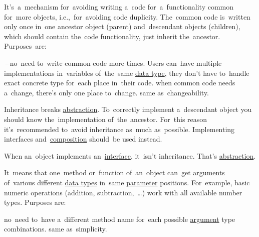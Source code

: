 \label{inheritance}
It's~a~mechanism for~avoiding writing a~code for~a~functionality common for~more objects, i.e.,~for~avoiding code duplicity.
The~common code is~written only once in~one ancestor object (parent) and~descendant objects (children), which should contain the~code functionality, just inherit the~ancestor.
Purposes~are:
\begin{itemize}
    \,--\,no~need to~write common code more times.
            Users can~have multiple implementations in~variables of~the~same \hyperref[datatypes]{data type}, they don't have to~handle exact concrete type for~each place in~their code.
     when common code needs a~change, there's only one place to~change.
     same as~changeability.
\end{itemize}

\warning Inheritance breaks \hyperref[abstraction]{abstraction}.
To~correctly implement a~descendant object you should know the~implementation of~the~ancestor.
For~this reason it's~recommended to~avoid inheritance as~much as~possible.
Implementing interfaces and~\hyperref[compositionoverinheritance]{composition} should~be used instead.

\warning When an~object implements an~\hyperref[javainterface]{interface}, it~isn't inheritance.
That's \hyperref[abstraction]{abstraction}.

\label{polymorphism}
It~means that one~method or~function of~an~object can~get \hyperref[parameterargument]{arguments} of~various different \hyperref[datatypes]{data types} in~same \hyperref[parameterargument]{parameter} positions.
For~example, basic numeric operations (addition, subtraction,~\dots) work with all available number types.
Purposes are:
\begin{itemize}
     no~need to~have a~different method name for~each possible \hyperref[parameterargument]{argument} type combinations.
     same as~simplicity.
\end{itemize}
\newline

